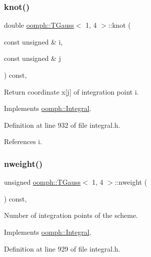 \subsubsection{\texorpdfstring{knot()}{knot()}}
{\footnotesize\ttfamily double \hyperlink{classoomph_1_1TGauss}{oomph\+::\+T\+Gauss}$<$ 1, 4 $>$\+::knot (\begin{DoxyParamCaption}\item[{const unsigned \&}]{i,  }\item[{const unsigned \&}]{j }\end{DoxyParamCaption}) const\hspace{0.3cm}{\ttfamily [inline]}, {\ttfamily [virtual]}}



Return coordinate x\mbox{[}j\mbox{]} of integration point i. 



Implements \hyperlink{classoomph_1_1Integral_a1a2122f99a87c18649bafdd9ed739758}{oomph\+::\+Integral}.



Definition at line 932 of file integral.\+h.



References i.

\mbox{\label{classoomph_1_1TGauss_3_011_00_014_01_4_a8d87fc81e81aefe26e6c9a3ef5628231}} 
\subsubsection{\texorpdfstring{nweight()}{nweight()}}
{\footnotesize\ttfamily unsigned \hyperlink{classoomph_1_1TGauss}{oomph\+::\+T\+Gauss}$<$ 1, 4 $>$\+::nweight (\begin{DoxyParamCaption}{ }\end{DoxyParamCaption}) const\hspace{0.3cm}{\ttfamily [inline]}, {\ttfamily [virtual]}}



Number of integration points of the scheme. 



Implements \hyperlink{classoomph_1_1Integral_a1a270de9d99a1fcf1d25a6c1017f65fa}{oomph\+::\+Integral}.



Definition at line 929 of file integral.\+h.

